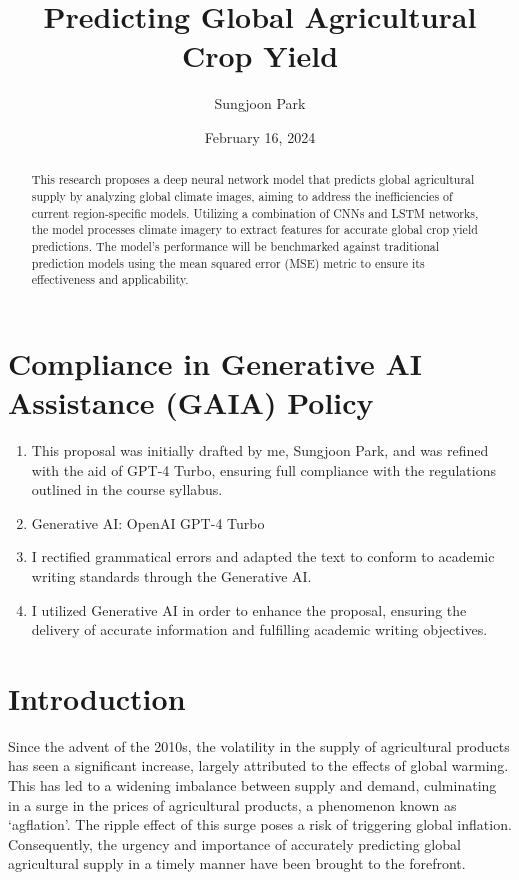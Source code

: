 \documentclass[11pt, oneside]{article}   	%
\title{Predicting Global Agricultural Crop Yield}
\author{Sungjoon Park}
\date{February 16, 2024}		%
\begin{document}
\maketitle
\begin{abstract}
This research proposes a deep neural network model that predicts global agricultural supply by analyzing global climate images, aiming to address the inefficiencies of current region-specific models. Utilizing a combination of CNNs and LSTM networks, the model processes climate imagery to extract features for accurate global crop yield predictions. The model’s performance will be benchmarked against traditional prediction models using the mean squared error (MSE) metric to ensure its effectiveness and applicability.
\end{abstract}

\section*{Compliance in Generative AI Assistance (GAIA) Policy}

\begin{enumerate}
\item This proposal was initially drafted by me, Sungjoon Park, and was refined with the aid of GPT-4 Turbo, ensuring full compliance with the regulations outlined in the course syllabus.
\item Generative AI: OpenAI GPT-4 Turbo
\item I rectified grammatical errors and adapted the text to conform to academic writing standards through the Generative AI.
\item I utilized Generative AI in order to enhance the proposal, ensuring the delivery of accurate information and fulfilling academic writing objectives.
\end{enumerate}

\section*{Introduction}



Since the advent of the 2010s, the volatility in the supply of agricultural products has seen a significant increase, largely attributed to the effects of global warming. This has led to a widening imbalance between supply and demand, culminating in a surge in the prices of agricultural products, a phenomenon known as ‘agflation’. The ripple effect of this surge poses a risk of triggering global inflation. Consequently, the urgency and importance of accurately predicting global agricultural supply in a timely manner have been brought to the forefront.
\end{document}
